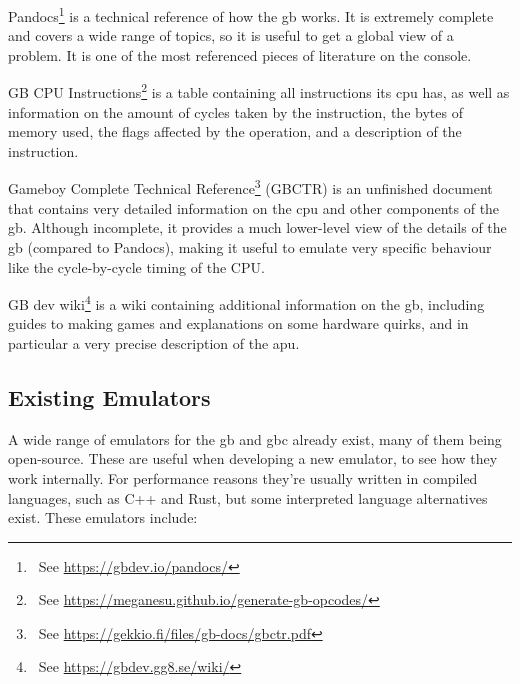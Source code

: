 \documentclass[11pt]{informatics-report}
\newcommand{\ftnt}[1]{\footnote{~See \url{#1}}}
\begin{document}
\begin{compactitem}
    \item Pandocs\ftnt{https://gbdev.io/pandocs/} is a technical reference of how the \gls{gb} works. It is extremely complete and covers a wide range of topics, so it is useful to get a global view of a problem. It is one of the most referenced pieces of literature on the console.
    \item GB CPU Instructions\ftnt{https://meganesu.github.io/generate-gb-opcodes/} is a table containing all instructions its \gls{cpu} has, as well as information on the amount of cycles taken by the instruction, the bytes of memory used, the flags affected by the operation, and a description of the instruction.
    \item Gameboy Complete Technical Reference\ftnt{https://gekkio.fi/files/gb-docs/gbctr.pdf} (GBCTR) is an unfinished document that contains very detailed information on the \gls{cpu} and other components of the \gls{gb}. Although incomplete, it provides a much lower-level view of the details of the \gls{gb} (compared to Pandocs), making it useful to emulate very specific behaviour like the cycle-by-cycle timing of the CPU.
    \item GB dev wiki\ftnt{https://gbdev.gg8.se/wiki/} is a wiki containing additional information on the \gls{gb}, including guides to making games and explanations on some hardware quirks, and in particular a very precise description of the \gls{apu}.
\end{compactitem}

\subsection{Existing Emulators}

A wide range of emulators for the \gls{gb} and \gls{gbc} already exist, many of them being open-source. These are useful when developing a new emulator, to see how they work internally. For performance reasons they're usually written in compiled languages, such as C++ and Rust, but some interpreted language alternatives exist. These emulators include:
\end{document}
